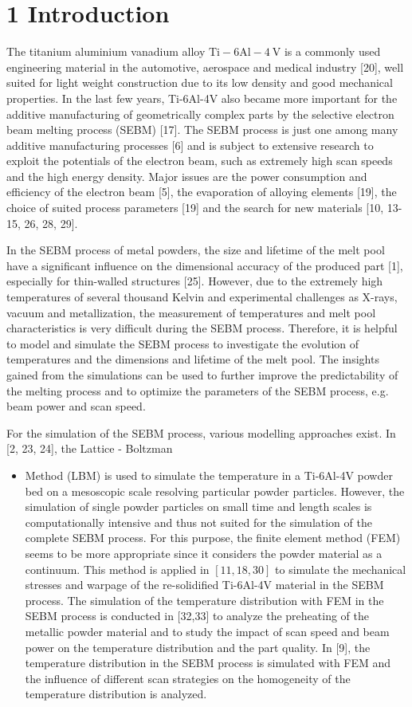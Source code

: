 \documentclass[10pt]{article}
\begin{document}
\section*{1 Introduction}
The titanium aluminium vanadium alloy $\mathrm{Ti}-6 \mathrm{Al}-4 \mathrm{~V}$ is a commonly used engineering material in the automotive, aerospace and medical industry [20], well suited for light weight construction due to its low density and good mechanical properties. In the last few years, Ti-6Al-4V also became more important for the additive manufacturing of geometrically complex parts by the selective electron beam melting process (SEBM) [17]. The SEBM process is just one among many additive manufacturing processes [6] and is subject to extensive research to exploit the potentials of the electron beam, such as extremely high scan speeds and the high energy density. Major issues are the power consumption and efficiency of the electron beam [5], the evaporation of alloying elements [19], the choice of suited process parameters [19] and the search for new materials [10, 13-15, 26, 28, 29].

In the SEBM process of metal powders, the size and lifetime of the melt pool have a significant influence on the dimensional accuracy of the produced part [1], especially for thin-walled structures [25]. However, due to the extremely high temperatures of several thousand Kelvin and experimental challenges as X-rays, vacuum and metallization, the measurement of temperatures and melt pool characteristics is very difficult during the SEBM process. Therefore, it is helpful to model and simulate the SEBM process to investigate the evolution of temperatures and the dimensions and lifetime of the melt pool. The insights gained from the simulations can be used to further improve the predictability of the melting process and to optimize the parameters of the SEBM process, e.g. beam power and scan speed.

For the simulation of the SEBM process, various modelling approaches exist. In [2, 23, 24], the Lattice - Boltzman

\begin{itemize}
  \item Method (LBM) is used to simulate the temperature in a Ti-6Al-4V powder bed on a mesoscopic scale resolving particular powder particles. However, the simulation of single powder particles on small time and length scales is computationally intensive and thus not suited for the simulation of the complete SEBM process. For this purpose, the finite element method (FEM) seems to be more appropriate since it considers the powder material as a continuum. This method is applied in $[11,18,30]$ to simulate the mechanical stresses and warpage of the re-solidified Ti-6Al-4V material in the SEBM process. The simulation of the temperature distribution with FEM in the SEBM process is conducted in [32,33] to analyze the preheating of the metallic powder material and to study the impact of scan speed and beam power on the temperature distribution and the part quality. In [9], the temperature distribution in the SEBM process is simulated with FEM and the influence of different scan strategies on the homogeneity of the temperature distribution is analyzed.
\end{itemize}
\end{document}
